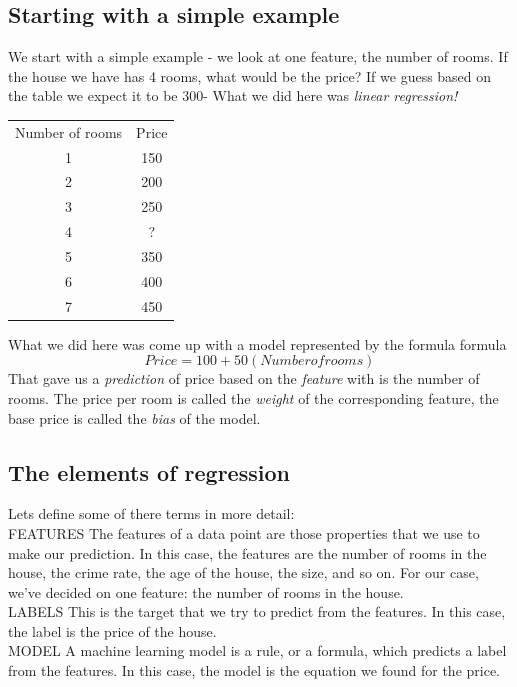 \documentclass{report}
\begin{document}
\subsection{Starting with a simple example}
We start with a simple example - we look at one feature, the number of rooms. If the house we have has 4 rooms, what would be the price? If we guess based on the table we expect it to be 300- What we did here was \emph{linear regression!}
\begin{center}
\begin{tabular}{ c c  }
 Number of rooms & Price \\ 
 1 & 150 \\
 2 & 200 \\ 
 3 & 250 \\ 
 4 & ? \\ 
 5 & 350 \\ 
 6 & 400 \\ 
 7 & 450    
\end{tabular}
\end{center}

What we did here was come up with a model represented by the formula formula $$Price = 100 + 50(Number of rooms) $$ That gave us a \emph{prediction} of price based on the \emph{feature} with is the number of rooms. The price per room is called the \emph{weight } of the corresponding feature, the base price is called the \emph{bias} of the model. 


\subsection{The elements of regression}

Lets define some of there terms in more detail:\\

FEATURES
The features of a data point are those properties that we use to make our prediction. In this case, the features are the number of rooms in the house, the crime rate, the age of the house, the size, and so on. For our case, we’ve decided on one feature: the number of rooms in the house.\\

LABELS
This is the target that we try to predict from the features. In this case, the label is the price of the house.\\

MODEL
A machine learning model is a rule, or a formula, which predicts a label from the features. In this case, the model is the equation we found for the price.\\
\end{document}
